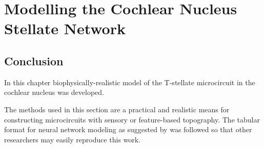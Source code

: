 \documentclass[11pt,a4paper,twoside,openright]{book}
\begin{document}

\setcounter{chapter}{2}
\chapter[Simple Responses]{Modelling the Cochlear Nucleus Stellate Network}
\label{sec:SimpleResponsesChapter}

		{%
			\singlespacing%
                        \listoftodos
			\tableofcontents%
                        \printglossary
		   \clearpage%
		}%



\newpage

\newpage

\newpage

% 
\newpage


\section{Conclusion}

In this chapter biophysically-realistic model of the
T-stellate microcircuit in the cochlear nucleus was developed.


The methods used in this section are a practical and realistic means
for constructing microcircuits with sensory or feature-based
topography.  The tabular format for neural network modeling as
suggested by \citet{NordlieGewaltigEtAl:2009} was followed so that other
researchers may easily reproduce this work. 


\appendix


 
\end{document}
